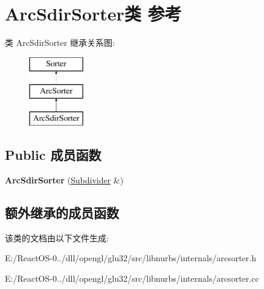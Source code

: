 \hypertarget{class_arc_sdir_sorter}{}\section{Arc\+Sdir\+Sorter类 参考}
\label{class_arc_sdir_sorter}
类 Arc\+Sdir\+Sorter 继承关系图\+:\begin{figure}[H]
\begin{center}
\leavevmode
\includegraphics[height=3.000000cm]{class_arc_sdir_sorter}
\end{center}
\end{figure}
\subsection*{Public 成员函数}
\begin{DoxyCompactItemize}
\item 
\mbox{\label{class_arc_sdir_sorter_a1df6c09233a7bf4a4aed2df77dee8d6d}} 
{\bfseries Arc\+Sdir\+Sorter} (\hyperlink{class_subdivider}{Subdivider} \&)
\end{DoxyCompactItemize}
\subsection*{额外继承的成员函数}


该类的文档由以下文件生成\+:\begin{DoxyCompactItemize}
\item 
E\+:/\+React\+O\+S-\/0../dll/opengl/glu32/src/libnurbs/internals/arcsorter.\+h\item 
E\+:/\+React\+O\+S-\/0../dll/opengl/glu32/src/libnurbs/internals/arcsorter.\+cc\end{DoxyCompactItemize}
